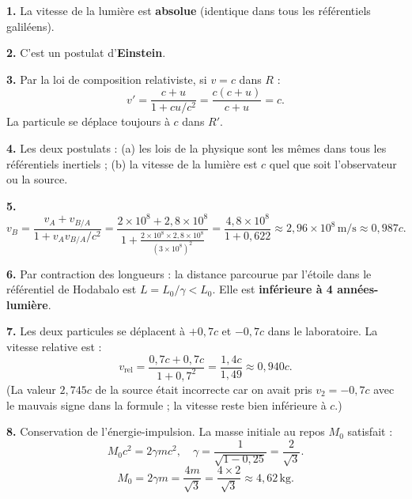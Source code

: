 \documentclass[12pt,a4paper]{article}
\begin{document}
\begin{boitecorrige}
\textbf{1.} La vitesse de la lumière est \textbf{absolue} (identique dans tous les référentiels galiléens).

\textbf{2.} C'est un postulat d'\textbf{Einstein}.

\textbf{3.} Par la loi de composition relativiste, si $v = c$ dans $R$ :
\[
v' = \frac{c + u}{1 + cu/c^2} = \frac{c(c+u)}{c+u} = c.
\]
La particule se déplace toujours à $c$ dans $R'$.

\textbf{4.} Les deux postulats : (a) les lois de la physique sont les mêmes dans tous les référentiels inertiels ; (b) la vitesse de la lumière est $c$ quel que soit l'observateur ou la source.

\textbf{5.}
\[
v_B = \frac{v_A + v_{B/A}}{1 + v_A v_{B/A}/c^2}
= \frac{2\times10^8 + 2{,}8\times10^8}{1 + \frac{2\times10^8 \times 2{,}8\times10^8}{(3\times10^8)^2}}
= \frac{4{,}8\times10^8}{1 + 0{,}622}
\approx \boxed{2{,}96\times10^8\,\text{m/s} \approx 0{,}987c.}
\]

\textbf{6.} Par contraction des longueurs : la distance parcourue par l'étoile dans le référentiel de Hodabalo est $L = L_0/\gamma < L_0$. Elle est \textbf{inférieure à 4 années-lumière}.

\textbf{7.} Les deux particules se déplacent à $+0{,}7c$ et $-0{,}7c$ dans le laboratoire. La vitesse relative est :
\[
v_\text{rel} = \frac{0{,}7c + 0{,}7c}{1 + 0{,}7^2} = \frac{1{,}4c}{1{,}49} \approx \boxed{0{,}940c.}
\]
(La valeur $2{,}745c$ de la source était incorrecte car on avait pris $v_2=-0{,}7c$ avec le mauvais signe dans la formule ; la vitesse reste bien inférieure à $c$.)

\textbf{8.} Conservation de l'énergie-impulsion. La masse initiale au repos $M_0$ satisfait :
\[
M_0 c^2 = 2\gamma m c^2, \quad \gamma = \frac{1}{\sqrt{1-0{,}25}} = \frac{2}{\sqrt{3}}.
\]
\[
M_0 = 2\gamma m = \frac{4m}{\sqrt{3}} = \frac{4\times2}{\sqrt{3}} \approx \boxed{4{,}62\,\text{kg}.}
\]
\end{boitecorrige}

\ifdefined\inMainDoc\else
\end{document}
